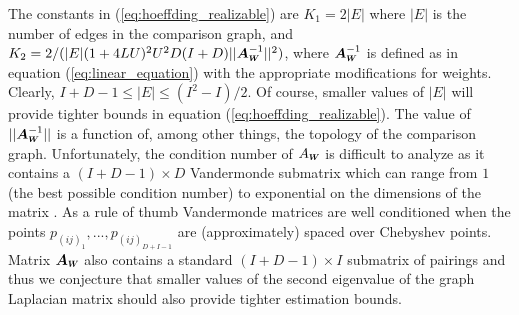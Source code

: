 \documentclass[twoside,11pt]{article}
\newcommand*{\Scale}[2][4]{\scalebox{#1}{$#2$}}%
\begin{document}
The constants in (\ref{eq:hoeffding_realizable}) are $K_1 = 2|E|$ where $|E|$ is the number of edges in the comparison graph, and 
$K_2 = 2/(|E|(1+4LU)^2U^2D(I+D)||\boldsymbol{A}^{-1}_{\Scale[.6]{\boldsymbol{W}}}||^2)$, where $\boldsymbol{A}^{-1}_{\Scale[.6]{\boldsymbol{W}}}$ is defined as in equation (\ref{eq:linear_equation}) with the appropriate modifications for weights. Clearly, $I+D-1 \leq |E| \leq (I^2-I)/2$. Of course, smaller values of $|E|$ will provide tighter bounds in equation (\ref{eq:hoeffding_realizable}). The value of $|| \boldsymbol{A}_{\Scale[.6]{\boldsymbol{W}}}^{-1}||$ is a function of, among other things, the topology of the comparison graph. Unfortunately, the condition number of $A_{\Scale[.6]{\boldsymbol{W}}}$ is difficult to analyze as it contains a $(I+D-1) \times D$ Vandermonde submatrix which can range from $1$ (the best possible condition number) to exponential on the dimensions of the matrix \citep{pan}. As a rule of thumb Vandermonde matrices are well conditioned when the points $p_{(ij)_1},...,p_{(ij)_{D+I-1}}$ are (approximately) spaced over Chebyshev points. Matrix  $\boldsymbol{A}_{\Scale[.6]{\boldsymbol{W}}}$ also contains a standard $(I+D-1)\times I$ submatrix of pairings and thus we conjecture that smaller values of the second eigenvalue of the graph Laplacian matrix should also provide tighter estimation bounds.



\end{document}
